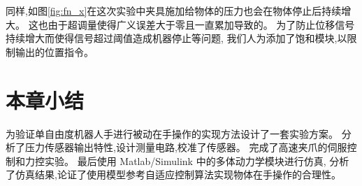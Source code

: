 同样,如图\ref{fig:fn_x}在这次实验中夹具施加给物体的压力也会在物体停止后持续增大。
这也由于超调量使得广义误差大于零且一直累加导致的。
为了防止位移信号持续增大而使得信号超过阈值造成机器停止等问题,
我们人为添加了饱和模块,以限制输出的位置指令。


\section{本章小结}
为验证单自由度机器人手进行被动在手操作的实现方法设计了一套实验方案。
分析了压力传感器输出特性,设计测量电路,校准了传感器。
完成了高速夹爪的伺服控制和力控实验。
最后使用 Matlab/Simulink 中的多体动力学模块进行仿真,
分析了仿真结果,论证了使用模型参考自适应控制算法实现物体在手操作的合理性。

